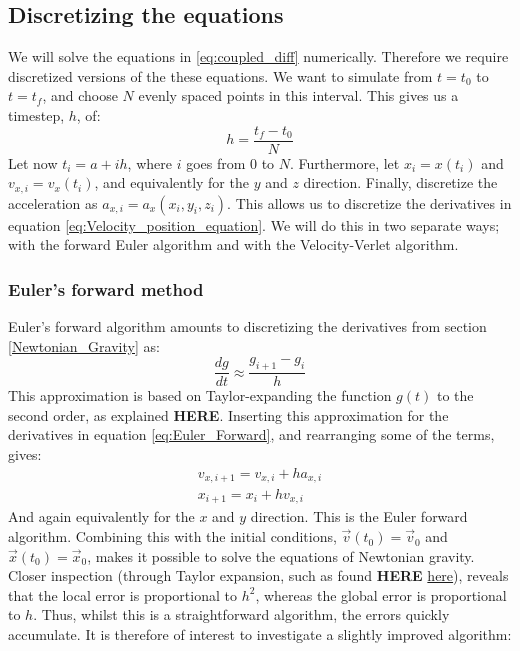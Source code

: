 \documentclass[a4paper, 10pt]{article}
\begin{document}
\subsection{Discretizing the equations}\label{discretize_equations}
We will solve the equations in \ref{eq:coupled_diff} numerically. Therefore we require discretized versions of the these equations. We want to simulate from $t=t_0$ to $t=t_f$, and choose $N$ evenly spaced points in this interval. This gives us a timestep, $h$, of:
$$h=\frac{t_f-t_0}{N}$$
Let now $t_i=a+ih$, where $i$ goes from $0$ to $N$. Furthermore, let $x_i=x(t_i)$ and $ v_{x,i}=v_x(t_i)$, and equivalently for the $y$ and $z$ direction. Finally, discretize the acceleration as $a_{x,i}=a_x(x_i, y_i, z_i)$. This allows us to discretize the derivatives in equation \ref{eq:Velocity_position_equation}. We will do this in two separate ways; with the forward Euler algorithm and with the Velocity-Verlet algorithm.
\subsubsection{Euler's forward method}
Euler's forward algorithm amounts to discretizing the derivatives from section \ref{Newtonian_Gravity} as:
\begin{equation}\label{eq:Euler_Forward}
\frac{dg}{dt}\approx \frac{g_{i+1}-g_i}{h}
\end{equation}
This approximation is based on Taylor-expanding the function $g(t)$ to the second order, as explained \textbf{HERE}. Inserting this approximation for the derivatives in equation \ref{eq:Euler_Forward}, and rearranging some of the terms, gives:
\begin{equation}
\begin{split}
v_{x, i+1}=v_{x,i}+ha_{x,i}\\
x_{i+1}=x_i+hv_{x,i}
\end{split}
\end{equation}
And again equivalently for the $x$ and $y$ direction. This is the Euler forward algorithm. Combining this with the initial conditions, $\vec{v}(t_0)=\vec{v}_0$ and $\vec{x}(t_0)=\vec{x}_0$, makes it possible to solve the equations of Newtonian gravity. Closer inspection (through Taylor expansion, such as found \textbf{HERE} \href{http://www.math.unl.edu/~gledder1/Math447/EulerError}{here}), reveals that the local error is proportional to $h^2$, whereas the global error is proportional to $h$. Thus, whilst this is a straightforward algorithm, the errors quickly accumulate. It is therefore of interest to investigate a slightly improved algorithm:
\end{document}
